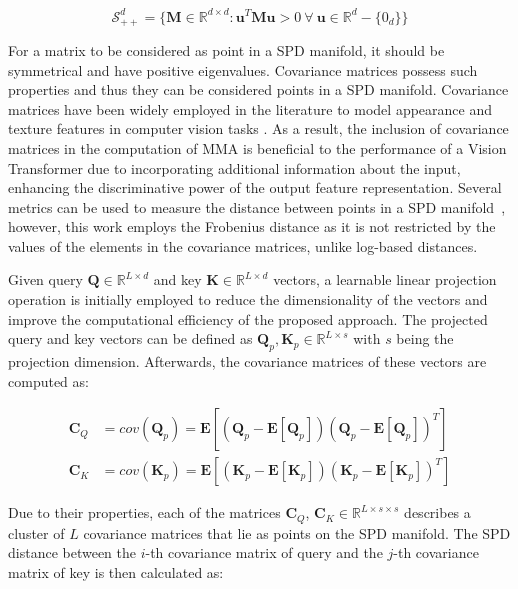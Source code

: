 \documentclass[10pt,twocolumn,letterpaper]{article}
\begin{document}
\begin{equation}
    \mathcal{S}_{++}^d = \{ \textbf{M} \in \mathbb{R}^{d\times d}: \textbf{u}^T\textbf{M}\textbf{u} > 0 ~ 	\forall ~\textbf{u} \in \mathbb{R}^{d} - \{0_d\}\}
\end{equation}

For a matrix to be considered as point in a SPD manifold, it should be symmetrical and have positive eigenvalues. Covariance matrices possess such properties and thus they can be considered points in a SPD manifold. Covariance matrices have been widely employed in the literature to model appearance and texture features in computer vision tasks \cite{Author17,Author42}. As a result, the inclusion of covariance matrices in the computation of MMA is beneficial to the performance of a Vision Transformer due to incorporating additional information about the input, enhancing the discriminative power of the output feature representation. Several metrics can be used to measure the distance between points in a SPD manifold~\cite{Author13}, however, this work employs the Frobenius distance as it is not restricted by the values of the elements in the covariance matrices, unlike log-based distances.

Given query $\textbf{Q} \in \mathbb{R}^{L \times d}$ and key $\textbf{K} \in \mathbb{R}^{L \times d}$ vectors, a learnable linear projection operation is initially employed to reduce the dimensionality of the vectors and improve the computational efficiency of the proposed approach. The projected query and key vectors can be defined as $\textbf{Q}_p, \textbf{K}_p \in \mathbb{R}^{L \times s}$ with $s$ being the projection dimension. Afterwards, the covariance matrices of these vectors are computed as:

\begin{align}
    \textbf{C}_Q &= cov(\textbf{Q}_p) = \textbf{E}[(\textbf{Q}_p - \textbf{E}[\textbf{Q}_p])(\textbf{Q}_p - \textbf{E}[\textbf{Q}_p])^T]\label{eq:cq}\\
    \textbf{C}_K &= cov(\textbf{K}_p) = \textbf{E}[(\textbf{K}_p - \textbf{E}[\textbf{K}_p])(\textbf{K}_p - \textbf{E}[\textbf{K}_p])^T]\label{eq:ck}
\end{align}

Due to their properties, each of the matrices $\textbf{C}_Q$, $\textbf{C}_K \in \mathbb{R}^{L\times s\times s}$ describes a cluster of $L$ covariance matrices that lie as points on the SPD manifold. The SPD distance between the $i$-th covariance matrix of query and the $j$-th covariance matrix of key is then calculated as:
\end{document}
